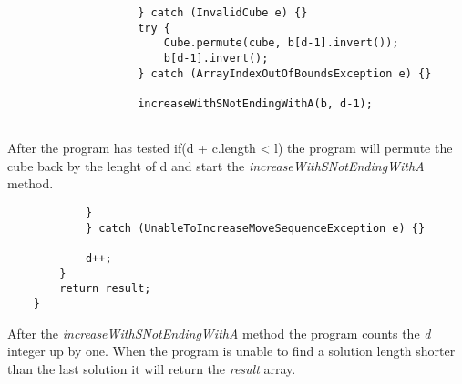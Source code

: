 \begin{verbatim}
					} catch (InvalidCube e) {}
					try {
						Cube.permute(cube, b[d-1].invert());
						b[d-1].invert();
					} catch (ArrayIndexOutOfBoundsException e) {}

					increaseWithSNotEndingWithA(b, d-1);
					
\end{verbatim}
After the program has tested if(d + c.length < l) the program will permute the cube back by the lenght of d and start the \textit{increaseWithSNotEndingWithA} method.

\begin{verbatim}
			}
			} catch (UnableToIncreaseMoveSequenceException e) {}

			d++;
		}
		return result;
	}
\end{verbatim}

After the  \textit{increaseWithSNotEndingWithA} method the program counts the \textit{d} integer up by one. 
When the program is unable to find a solution length shorter than the last solution it will return the \textit{result} array.